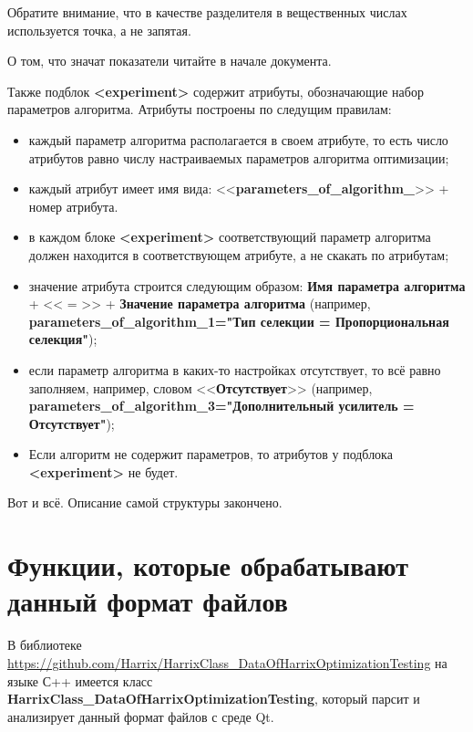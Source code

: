 \documentclass[a4paper,12pt]{article}
\begin{document}
Обратите внимание, что в качестве разделителя в вещественных числах используется точка, а не запятая.

О том, что значат показатели читайте в начале документа.

Также подблок \textbf{<experiment>} содержит атрибуты, обозначающие набор параметров алгоритма. Атрибуты построены по следущим правилам:
\begin{itemize}
\item каждый параметр алгоритма располагается в своем атрибуте, то есть число атрибутов равно числу настраиваемых параметров алгоритма оптимизации;
\item каждый атрибут имеет имя вида: <<\textbf{parameters\_of\_algorithm\_}>> + номер атрибута.
\item в каждом блоке \textbf{<experiment>} соответствующий параметр алгоритма должен находится в соответствующем атрибуте, а не скакать по атрибутам;
\item значение атрибута строится следующим образом: \textbf{Имя параметра алгоритма} + << = >> + \textbf{Значение параметра алгоритма} (например, \textbf{parameters\_of\_algorithm\_1="Тип селекции = Пропорциональная селекция"});
\item если параметр алгоритма в каких-то настройках отсутствует, то всё равно заполняем, например, словом <<\textbf{Отсутствует}>> (например, \textbf{parameters\_of\_algorithm\_3="Дополнительный усилитель = Отсутствует"});
\item Если алгоритм не содержит параметров, то атрибутов у подблока \textbf{<experiment>} не будет.
\end{itemize}

Вот и всё. Описание самой структуры закончено.

\section{Функции, которые обрабатывают данный формат файлов}

В библиотеке \href{https://github.com/Harrix/HarrixClass_DataOfHarrixOptimizationTesting} {https://github.com/Harrix/HarrixClass_DataOfHarrixOptimizationTesting} на языке С++ имеется класс \textbf{HarrixClass_DataOfHarrixOptimizationTesting}, который парсит и анализирует данный формат файлов с среде Qt.
\end{document}
